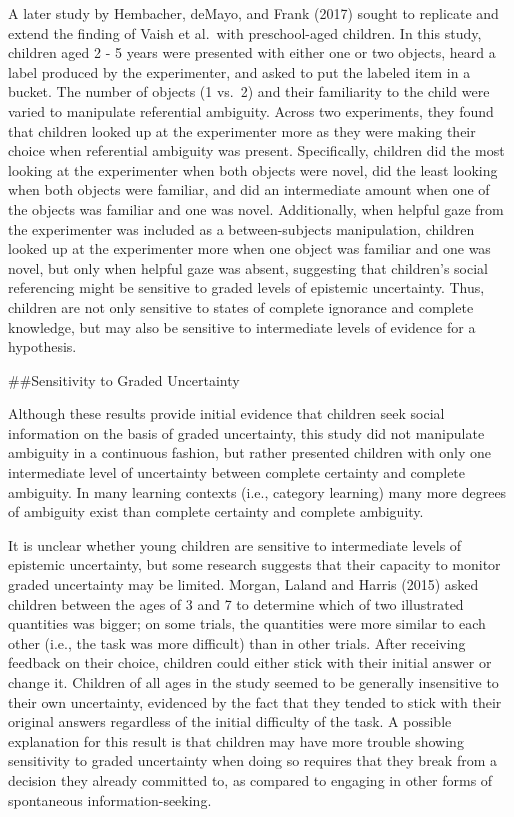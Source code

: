 \documentclass[,man,floatsintext]{apa6}
\begin{document}
A later study by Hembacher, deMayo, and Frank (2017) sought to replicate and extend the finding of Vaish et al.~with preschool-aged children. In this study, children aged 2 - 5 years were presented with either one or two objects, heard a label produced by the experimenter, and asked to put the labeled item in a bucket. The number of objects (1 vs.~2) and their familiarity to the child were varied to manipulate referential ambiguity. Across two experiments, they found that children looked up at the experimenter more as they were making their choice when referential ambiguity was present. Specifically, children did the most looking at the experimenter when both objects were novel, did the least looking when both objects were familiar, and did an intermediate amount when one of the objects was familiar and one was novel. Additionally, when helpful gaze from the experimenter was included as a between-subjects manipulation, children looked up at the experimenter more when one object was familiar and one was novel, but only when helpful gaze was absent, suggesting that children's social referencing might be sensitive to graded levels of epistemic uncertainty. Thus, children are not only sensitive to states of complete ignorance and complete knowledge, but may also be sensitive to intermediate levels of evidence for a hypothesis.

\#\#Sensitivity to Graded Uncertainty

Although these results provide initial evidence that children seek social information on the basis of graded uncertainty, this study did not manipulate ambiguity in a continuous fashion, but rather presented children with only one intermediate level of uncertainty between complete certainty and complete ambiguity. In many learning contexts (i.e., category learning) many more degrees of ambiguity exist than complete certainty and complete ambiguity.

It is unclear whether young children are sensitive to intermediate levels of epistemic uncertainty, but some research suggests that their capacity to monitor graded uncertainty may be limited. Morgan, Laland and Harris (2015) asked children between the ages of 3 and 7 to determine which of two illustrated quantities was bigger; on some trials, the quantities were more similar to each other (i.e., the task was more difficult) than in other trials. After receiving feedback on their choice, children could either stick with their initial answer or change it. Children of all ages in the study seemed to be generally insensitive to their own uncertainty, evidenced by the fact that they tended to stick with their original answers regardless of the initial difficulty of the task. A possible explanation for this result is that children may have more trouble showing sensitivity to graded uncertainty when doing so requires that they break from a decision they already committed to, as compared to engaging in other forms of spontaneous information-seeking.
\end{document}

